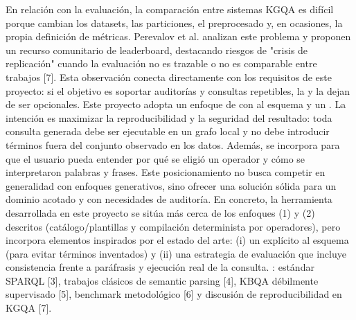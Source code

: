 {}\markdownRendererInterblockSeparator
{}En relación con la evaluación, la comparación entre sistemas KGQA es difícil porque cambian los datasets, las particiones, el preprocesado y, en ocasiones, la propia definición de métricas. Perevalov et al. analizan este problema y proponen un recurso comunitario de leaderboard, destacando riesgos de "crisis de replicación" cuando la evaluación no es trazable o no es comparable entre trabajos [7]. Esta observación conecta directamente con los requisitos de este proyecto: si el objetivo es soportar auditorías y consultas repetibles, la  y la  dejan de ser opcionales.\markdownRendererInterblockSeparator
{}\markdownRendererInterblockSeparator
{}Este proyecto adopta un enfoque de  con  al esquema y un . La intención es maximizar la reproducibilidad y la seguridad del resultado: toda consulta generada debe ser ejecutable en un grafo local y no debe introducir términos fuera del conjunto observado en los datos. Además, se incorpora  para que el usuario pueda entender por qué se eligió un operador y cómo se interpretaron palabras y frases.\markdownRendererInterblockSeparator
{}Este posicionamiento no busca competir en generalidad con enfoques generativos, sino ofrecer una solución sólida para un dominio acotado y con necesidades de auditoría.\markdownRendererInterblockSeparator
{}En concreto, la herramienta desarrollada en este proyecto se sitúa más cerca de los enfoques (1) y (2) descritos (catálogo/plantillas y compilación determinista por operadores), pero incorpora elementos inspirados por el estado del arte: (i) un  explícito al esquema (para evitar términos inventados) y (ii) una estrategia de evaluación que incluye consistencia frente a paráfrasis y ejecución real de la consulta.\markdownRendererInterblockSeparator
{}: estándar SPARQL [3], trabajos clásicos de semantic parsing [4], KBQA débilmente supervisado [5], benchmark metodológico [6] y discusión de reproducibilidad en KGQA [7].\markdownRendererInterblockSeparator
{}\markdownRendererInterblockSeparator
